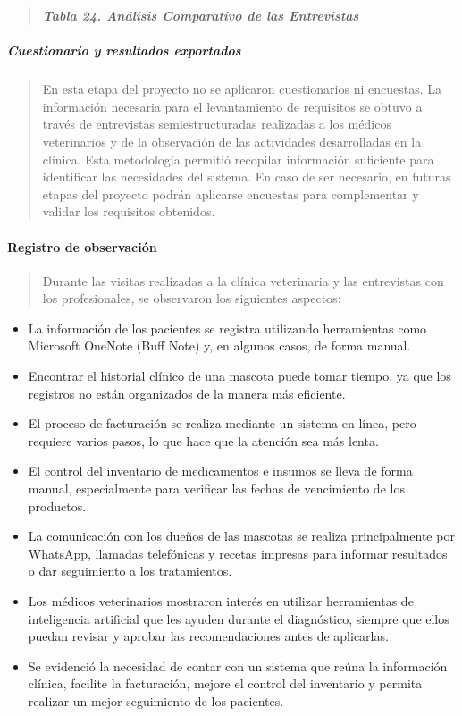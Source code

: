 \documentclass[
]{article}
\begin{document}
\begin{quote}
\protect{}\label{_bookmark84}{}\emph{\textbf{Tabla 24.
Análisis Comparativo de las Entrevistas}}
\end{quote}

\subparagraph{Cuestionario y resultados
exportados}\label{cuestionario-y-resultados-exportados}

\begin{quote}
En esta etapa del proyecto no se aplicaron cuestionarios ni encuestas.
La información necesaria para el levantamiento de requisitos se obtuvo a
través de entrevistas semiestructuradas realizadas a los médicos
veterinarios y de la observación de las actividades desarrolladas en la
clínica. Esta metodología permitió recopilar información suficiente para
identificar las necesidades del sistema. En caso de ser necesario, en
futuras etapas del proyecto podrán aplicarse encuestas para complementar
y validar los requisitos obtenidos.
\end{quote}

\paragraph{Registro de observación}\label{registro-de-observaciuxf3n}

\begin{quote}
Durante las visitas realizadas a la clínica veterinaria y las
entrevistas con los profesionales, se observaron los siguientes
aspectos:
\end{quote}

\begin{itemize}
\item
  La información de los pacientes se registra utilizando herramientas
  como Microsoft OneNote (Buff Note) y, en algunos casos, de forma
  manual.
\item
  Encontrar el historial clínico de una mascota puede tomar tiempo, ya
  que los registros no están organizados de la manera más eficiente.
\item
  El proceso de facturación se realiza mediante un sistema en línea,
  pero requiere varios pasos, lo que hace que la atención sea más lenta.
\item
  El control del inventario de medicamentos e insumos se lleva de forma
  manual, especialmente para verificar las fechas de vencimiento de los
  productos.
\item
  La comunicación con los dueños de las mascotas se realiza
  principalmente por WhatsApp, llamadas telefónicas y recetas impresas
  para informar resultados o dar seguimiento a los tratamientos.
\item
  Los médicos veterinarios mostraron interés en utilizar herramientas de
  inteligencia artificial que les ayuden durante el diagnóstico, siempre
  que ellos puedan revisar y aprobar las recomendaciones antes de
  aplicarlas.
\item
  Se evidenció la necesidad de contar con un sistema que reúna la
  información clínica, facilite la facturación, mejore el control del
  inventario y permita realizar un mejor seguimiento de los pacientes.
\end{itemize}
\end{document}
